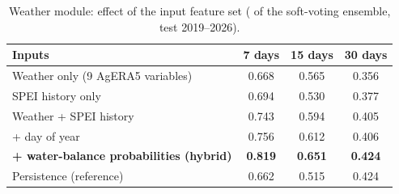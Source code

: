 \begin{table}[H]
\centering
\caption{Weather module: effect of the input feature set (\mf{} of the soft-voting ensemble, test 2019--2026).}
\label{tab:w_features}
\small
\begin{tabular}{@{}lccc@{}}
\toprule
\textbf{Inputs} & \textbf{7 days} & \textbf{15 days} & \textbf{30 days} \\
\midrule
Weather only (9 AgERA5 variables) & 0.668 & 0.565 & 0.356 \\
SPEI history only & 0.694 & 0.530 & 0.377 \\
Weather + SPEI history & 0.743 & 0.594 & 0.405 \\
+ day of year & 0.756 & 0.612 & 0.406 \\
\textbf{+ water-balance probabilities (hybrid)} & \textbf{0.819} & \textbf{0.651} & \textbf{0.424} \\
Persistence (reference) & 0.662 & 0.515 & 0.424 \\
\bottomrule
\end{tabular}
\end{table}
